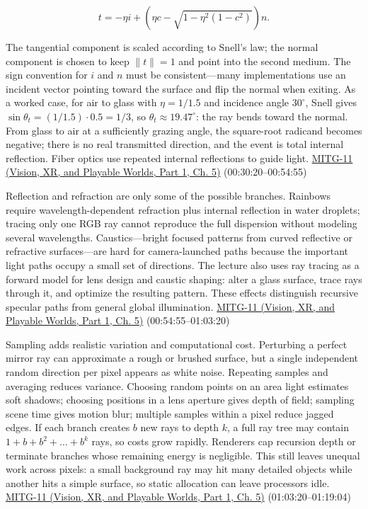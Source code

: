 \[
t=-\eta i+\left(\eta c-\sqrt{1-\eta^2(1-c^2)}\right)n.
\]

The tangential component is scaled according to Snell's law; the normal component is chosen to keep \(\|t\|=1\) and point into the second medium. The sign convention for \(i\) and \(n\) must be consistent---many implementations use an incident vector pointing toward the surface and flip the normal when exiting. As a worked case, for air to glass with \(\eta=1/1.5\) and incidence angle \(30^\circ\), Snell gives \(\sin\theta_t=(1/1.5)\cdot0.5=1/3\), so \(\theta_t\approx19.47^\circ\): the ray bends toward the normal. From glass to air at a sufficiently grazing angle, the square-root radicand becomes negative; there is no real transmitted direction, and the event is total internal reflection. Fiber optics use repeated internal reflections to guide light. \href{../07-Vision-XR-and-Playable-Worlds-P01/main.pdf\#04-visual-computing-ii-ch036-mitg-11---ray-tracing}{MITG-11 (Vision, XR, and Playable Worlds, Part 1, Ch. 5)} (00:30:20--00:54:55)

Reflection and refraction are only some of the possible branches. Rainbows require wavelength-dependent refraction plus internal reflection in water droplets; tracing only one RGB ray cannot reproduce the full dispersion without modeling several wavelengths. Caustics---bright focused patterns from curved reflective or refractive surfaces---are hard for camera-launched paths because the important light paths occupy a small set of directions. The lecture also uses ray tracing as a forward model for lens design and caustic shaping: alter a glass surface, trace rays through it, and optimize the resulting pattern. These effects distinguish recursive specular paths from general global illumination. \href{../07-Vision-XR-and-Playable-Worlds-P01/main.pdf\#04-visual-computing-ii-ch036-mitg-11---ray-tracing}{MITG-11 (Vision, XR, and Playable Worlds, Part 1, Ch. 5)} (00:54:55--01:03:20)

Sampling adds realistic variation and computational cost. Perturbing a perfect mirror ray can approximate a rough or brushed surface, but a single independent random direction per pixel appears as white noise. Repeating samples and averaging reduces variance. Choosing random points on an area light estimates soft shadows; choosing positions in a lens aperture gives depth of field; sampling scene time gives motion blur; multiple samples within a pixel reduce jagged edges. If each branch creates \(b\) new rays to depth \(k\), a full ray tree may contain \(1+b+b^2+\dots+b^k\) rays, so costs grow rapidly. Renderers cap recursion depth or terminate branches whose remaining energy is negligible. This still leaves unequal work across pixels: a small background ray may hit many detailed objects while another hits a simple surface, so static allocation can leave processors idle. \href{../07-Vision-XR-and-Playable-Worlds-P01/main.pdf\#04-visual-computing-ii-ch036-mitg-11---ray-tracing}{MITG-11 (Vision, XR, and Playable Worlds, Part 1, Ch. 5)} (01:03:20--01:19:04)

